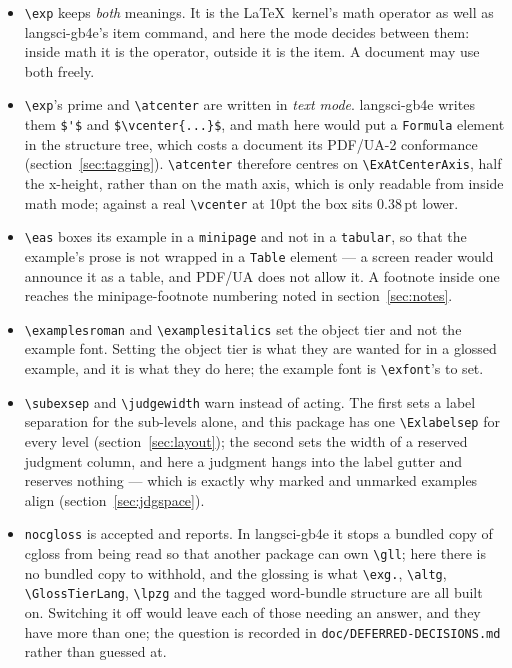 \documentclass[11pt,a4paper]{article}
\newcommand{\cs}[1]{\texttt{\textbackslash #1}}
\newcommand{\pkg}[2][]{\textsf{#2}}
\newcommand{\opt}[1]{\texttt{#1}}
\begin{document}
\begin{itemize}[leftmargin=*]
\item \cs{exp} keeps \emph{both} meanings. It is the \LaTeX\ kernel's math
  operator as well as \pkg{langsci-gb4e}'s item command, and here the mode
  decides between them: inside math it is the operator, outside it is the
  item. A document may use both freely.
\item \cs{exp}'s prime and \cs{atcenter} are written in \emph{text mode}.
  \pkg{langsci-gb4e} writes them \verb|$'$| and \verb|$\vcenter{...}$|, and math here
  would put a \texttt{Formula} element in the structure tree, which costs a
  document its PDF/UA-2 conformance (section~\ref{sec:tagging}). \cs{atcenter} therefore centres on
  \cs{ExAtCenterAxis}, half the x-height, rather than on the math axis,
  which is only readable from inside math mode; against a real
  \cs{vcenter} at 10pt the box sits 0.38\,pt lower.
\item \cs{eas} boxes its example in a \texttt{minipage} and not in a
  \texttt{tabular}, so that the example's prose is not wrapped in a
  \texttt{Table} element --- a screen reader would announce it as a table,
  and PDF/UA does not allow it. A footnote inside one
  reaches the minipage-footnote numbering noted in section~\ref{sec:notes}.
\item \cs{examplesroman} and \cs{examplesitalics} set the object tier and
  not the example font. Setting the object tier is what they are wanted for
  in a glossed example, and it is what they do here; the example font is
  \cs{exfont}'s to set.
\item \cs{subexsep} and \cs{judgewidth} warn instead of acting. The first
  sets a label separation for the sub-levels alone, and this package has one
  \cs{Exlabelsep} for every level (section~\ref{sec:layout}); the second
  sets the width of a reserved judgment column, and here a judgment hangs
  into the label gutter and reserves nothing --- which is exactly why marked
  and unmarked examples align (section~\ref{sec:jdgspace}).
\item \opt{nocgloss} is accepted and reports. In \pkg{langsci-gb4e} it stops
  a bundled copy of \pkg{cgloss} from being read so that another package can
  own \cs{gll}; here there is no bundled copy to withhold, and the glossing is
  what \cs{exg.}, \cs{altg}, \cs{GlossTierLang}, \cs{lpzg} and the tagged
  word-bundle structure are all built on. Switching it off would leave each
  of those needing an answer, and they have more than one; the question is
  recorded in \texttt{doc/DEFERRED-DECISIONS.md} rather than guessed at.
\end{itemize}
\end{document}
